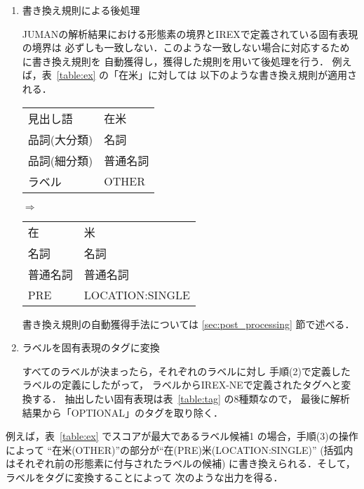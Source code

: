 \begin{enumerate}
\item 書き換え規則による後処理

  JUMANの解析結果における形態素の境界とIREXで定義されている固有表現の境界は
  必ずしも一致しない．このような一致しない場合に対応するために書き換え規則を
  自動獲得し，獲得した規則を用いて後処理を行う．
  例えば，表~\ref{table:ex} の「在米」に対しては
  以下のような書き換え規則が適用される．

  \vspace*{1em}

    \begin{center}
      \begin{tabular}[c]{l@{ }|l|}
        \cline{2-2}
        見出し語 & 在米 \\
        品詞(大分類) & 名詞 \\
        品詞(細分類) & 普通名詞 \\
        ラベル & OTHER \\
        \cline{2-2}
      \end{tabular}
      $\Rightarrow$
      \begin{tabular}[c]{|l@{ }l|}
        \hline
        在 & 米 \\
        名詞 & 名詞 \\
        普通名詞 & 普通名詞 \\ 
        PRE & LOCATION:SINGLE \\
        \hline
      \end{tabular}
    \end{center}

  \vspace*{1em}

  書き換え規則の自動獲得手法については \ref{sec:post_processing} 節で述べる．

\item ラベルを固有表現のタグに変換

  すべてのラベルが決まったら，それぞれのラベルに対し
  手順(2)で定義したラベルの定義にしたがって，
  ラベルからIREX-NEで定義されたタグへと変換する．
  抽出したい固有表現は表~\ref{table:tag} の8種類なので，
  最後に解析結果から「OPTIONAL」のタグを取り除く．

\end{enumerate}
  例えば，表~\ref{table:ex} でスコアが最大であるラベル候補1
  の場合，手順(3)の操作によって
  ``在米(OTHER)''の部分が``在(PRE)米(LOCATION:SINGLE)''
  (括弧内はそれぞれ前の形態素に付与されたラベルの候補)
  に書き換えられる．そして，ラベルをタグに変換することによって
  次のような出力を得る．

